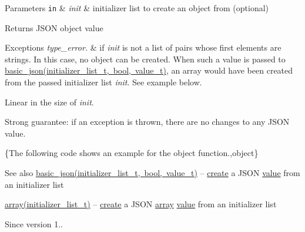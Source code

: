 \begin{DoxyParams}[1]{Parameters}
\mbox{\tt in}  & {\em init} & initializer list to create an object from (optional)\\
\hline
\end{DoxyParams}
\begin{DoxyReturn}{Returns}
J\+S\+ON object value
\end{DoxyReturn}

\begin{DoxyExceptions}{Exceptions}
{\em type\+\_\+error.} & if {\itshape init} is not a list of pairs whose first elements are strings. In this case, no object can be created. When such a value is passed to \mbox{\hyperlink{classnlohmann_1_1basic__json_ab5dfd9a2b2663b219641cb7fe59b6da2}{basic\+\_\+json(initializer\+\_\+list\+\_\+t, bool, value\+\_\+t)}}, an array would have been created from the passed initializer list {\itshape init}. See example below.\\
\hline
\end{DoxyExceptions}
Linear in the size of {\itshape init}.

Strong guarantee\+: if an exception is thrown, there are no changes to any J\+S\+ON value.

\{The following code shows an example for the {\ttfamily object} function.,object\}

\begin{DoxySeeAlso}{See also}
\mbox{\hyperlink{classnlohmann_1_1basic__json_ab5dfd9a2b2663b219641cb7fe59b6da2}{basic\+\_\+json(initializer\+\_\+list\+\_\+t, bool, value\+\_\+t)}} -- \mbox{\hyperlink{classnlohmann_1_1basic__json_a7b3ddcc9fb62cc378b0d431c430b91af}{create}} a J\+S\+ON \mbox{\hyperlink{classnlohmann_1_1basic__json_adcf8ca5079f5db993820bf50036bf45d}{value}} from an initializer list 

\mbox{\hyperlink{classnlohmann_1_1basic__json_a8a7d537fc297bbc5b845f92fe0445e3b}{array(initializer\+\_\+list\+\_\+t)}} -- \mbox{\hyperlink{classnlohmann_1_1basic__json_a7b3ddcc9fb62cc378b0d431c430b91af}{create}} a J\+S\+ON \mbox{\hyperlink{classnlohmann_1_1basic__json_a8a7d537fc297bbc5b845f92fe0445e3b}{array}} \mbox{\hyperlink{classnlohmann_1_1basic__json_adcf8ca5079f5db993820bf50036bf45d}{value}} from an initializer list
\end{DoxySeeAlso}
\begin{DoxySince}{Since}
version 1.. 
\end{DoxySince}
\mbox{\label{classnlohmann_1_1basic__json_a26ef3058e249f82a04f8ec18f7419027}} 
